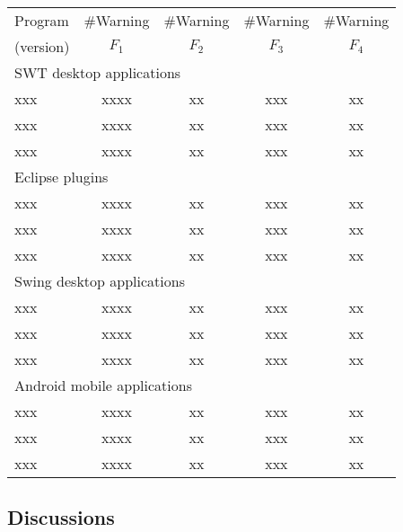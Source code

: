\begin{table}[t]
\begin{center}
 \fontsize{9pt}{\baselineskip}\selectfont
\hspace*{-0.2cm}
\begin{tabular}{|l||c|c|c|c|}
\hline
 Program  & \#Warning & \#Warning & \#Warning & \#Warning \\
 (version) & $F_1$ & $F_2$ & $F_3$&$F_4$ \\
\hline \hline
\multicolumn{5}{|l|}{SWT desktop applications}   \\
 \hline
 xxx &  xxxx &  xx &  xxx & xx \\
 \hline
 xxx &  xxxx &  xx &  xxx & xx \\
 \hline
 xxx &  xxxx &  xx &  xxx & xx \\
 \hline
 \hline
\multicolumn{5}{|l|}{Eclipse plugins}   \\
 \hline
 xxx &  xxxx &  xx &  xxx & xx \\
 \hline
 xxx &  xxxx &  xx &  xxx & xx \\
 \hline
 xxx &  xxxx &  xx &  xxx & xx \\
 \hline
 \hline
\multicolumn{5}{|l|}{Swing desktop applications}   \\
 \hline
 xxx &  xxxx &  xx &  xxx & xx \\
 \hline
 xxx &  xxxx &  xx &  xxx & xx \\
 \hline
 xxx &  xxxx &  xx &  xxx & xx \\
 \hline
 \hline
\multicolumn{5}{|l|}{Android mobile applications}   \\
 \hline
 xxx &  xxxx &  xx &  xxx & xx \\
 \hline
 xxx &  xxxx &  xx &  xxx & xx \\
 \hline
 xxx &  xxxx &  xx &  xxx & xx \\
\hline
\end{tabular}
\end{center}
\vspace{-15pt}
\end{table}


\subsection{Discussions}

